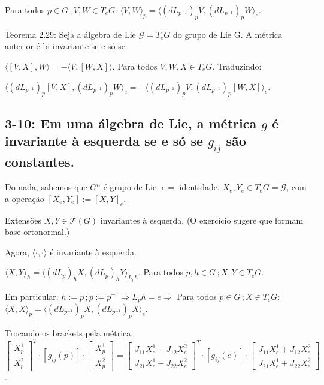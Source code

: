 \documentclass[10pt,a4paper]{article}
\begin{document}
		Para todos $p \in G\,; V, W \in T_eG$: $\langle V, W \rangle_p = \langle (dL_{p^{-1}})_p V, (dL_{p^{-1}})_p W \rangle_e$.

		Teorema 2.29: Seja a \'algebra de Lie $\mathcal{G} = T_eG$ do grupo de Lie G. A m\'etrica anterior \'e bi-invariante se e s\'o se

		$\langle [V, X], W \rangle = - \langle V, [W, X] \rangle$. Para todos $V, W, X \in T_eG$. Traduzindo:

		$\langle (dL_{p^{-1}})_p [V,X], (dL_{p^{-1}})_p W \rangle_e = - \langle (dL_{p^{-1}})_p V, (dL_{p^{-1}})_p [W,X] \rangle_e$.

		\subsection{3-10: Em uma \'algebra de Lie, a m\'etrica $g$ \'e invariante \`a esquerda se e s\'o se $g_{ij}$ s\~ao constantes.}
		\begin{flushright}
		\end{flushright}

		Do nada, sabemos que $G^n$ \'e grupo de Lie. $e =$ identidade. $X_e, Y_e \in T_eG = \mathcal{G}$, com a opera\c{c}\~ao $[X_e, Y_e] := [X, Y]_e$.

		Extens\~oes $X, Y \in \mathcal{T}(G)$ invariantes \`a esquerda. (O exerc\'icio sugere que formam base ortonormal.)

		Agora, $\langle \cdot, \cdot \rangle$ \'e invariante \`a esquerda.

		$\langle X, Y \rangle_h = \langle (dL_p)_h X, (dL_p)_h Y \rangle_{L_p h}$. Para todos $p,h \in G\,; X, Y \in T_eG$.

		Em particular: $h := p\,; p := p^{-1} \Rightarrow L_p h = e \Rightarrow $ Para todos $p \in G\,; X \in T_eG$: $\langle X, X \rangle_p = \langle (dL_{p^{-1}})_p X, (dL_{p^{-1}})_p X \rangle_e$.

		Trocando os brackets pela m\'etrica, $\left[ \begin{matrix} X_p^1 \\ X_p^2 \end{matrix} \right]^T \cdot [g_{ij}(p)] \cdot \left[ \begin{matrix} X_p^1 \\ X_p^2 \end{matrix} \right] = \left[ \begin{matrix} J_{11} X_e^1 + J_{12} X_e^2 \\ J_{21} X_e^1 + J_{22} X_e^2 \end{matrix} \right]^T \cdot [g_{ij}(e)] \cdot \left[ \begin{matrix} J_{11} X_e^1 + J_{12} X_e^2 \\ J_{21} X_e^1 + J_{22} X_e^2 \end{matrix} \right]$.
\end{document}
